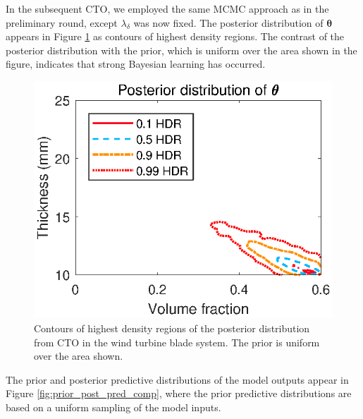 \documentclass[12pt]{article}
\begin{document}
%
In the subsequent CTO, we employed the same MCMC approach as in the preliminary round, except  $\lambda_\delta$ was now fixed.
%
The posterior distribution of $\boldsymbol\theta$ appears in Figure \ref{fig:wt_marg_post} as contours of highest density regions.
%
The contrast of the posterior distribution with the prior, which is uniform over the area shown in the figure, indicates that strong Bayesian learning has occurred.
%
\begin{figure}
\centering
\includegraphics[scale=0.8]{FIG_post_dist_contourplot}
\caption{Contours of highest density regions of the posterior distribution from CTO in the wind turbine blade system. The prior is uniform over the area shown.}
\label{fig:wt_marg_post}
\end{figure}
%
The prior and posterior predictive distributions of the model outputs appear in Figure \ref{fig:prior_post_pred_comp}, where the prior predictive distributions are based on a uniform sampling of the model inputs.
%
\end{document}
